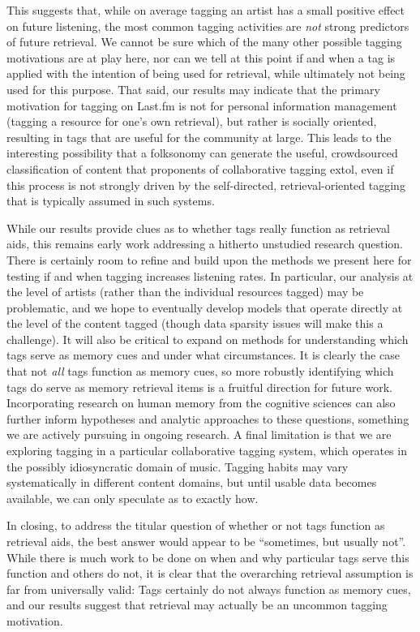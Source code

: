 This suggests that, while on average tagging an artist  has a small positive effect on future listening, the most common tagging activities are \emph{not} strong predictors of future retrieval. We cannot be sure which of the many other possible tagging motivations are at play here, nor can we tell at this point if and when a tag is applied with the intention of being used for retrieval, while ultimately not being used for this purpose. That said, our results may indicate that the primary motivation for tagging on Last.fm is not for personal information management (tagging a resource for one's own retrieval), but rather is socially oriented, resulting in tags that are useful for the community at large. This leads to the interesting possibility that a folksonomy can generate the useful, crowdsourced classification of content that proponents of collaborative tagging extol, even if this process is not strongly driven by the self-directed, retrieval-oriented tagging that is typically assumed in such systems.

While our results provide clues as to whether tags really function as retrieval aids, this remains early work addressing a hitherto unstudied research question. There is certainly room to refine and build upon the methods we present here for testing if and when tagging increases listening rates. In particular, our analysis at the level of artists (rather than the individual resources tagged) may be problematic, and we hope to eventually develop models that operate directly at the level of the content tagged (though data sparsity issues will make this a challenge). It will also be critical to expand on methods for understanding which tags serve as memory cues and under what circumstances. It is clearly the case that not \emph{all} tags function as memory cues, so more robustly identifying which tags do serve as memory retrieval items is a fruitful direction for future work. Incorporating research on human memory from the cognitive sciences can also further inform hypotheses and analytic approaches to these questions, something we are actively pursuing in ongoing research. A final limitation is that we are exploring tagging in a particular collaborative tagging system, which operates in the possibly idiosyncratic domain of music. Tagging habits may vary systematically in different content domains, but until usable data becomes available, we can only speculate as to exactly how.

In closing, to address the titular question of whether or not tags function as retrieval aids, the best answer would appear to be ``sometimes, but usually not''. While there is much work to be done on when and why particular tags serve this function and others do not, it is clear that the overarching retrieval assumption is far from universally valid: Tags certainly do not always function as memory cues, and our results suggest that retrieval may actually be an uncommon tagging motivation.

